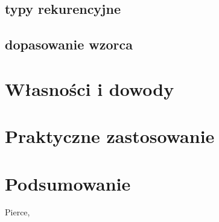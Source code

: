 \documentclass[11pt,leqno]{article}
\begin{document}
\subsection{typy rekurencyjne}
\subsection{dopasowanie wzorca}


\section{Własności i dowody}
\setcounter{equation}{0}



\section{Praktyczne zastosowanie}                       
\setcounter{equation}{0}


\section{Podsumowanie}                       
\setcounter{equation}{0}




\thispagestyle{empty}
\begin{thebibliography}{99}

 Pierce, \textit{} 


	  
\end{thebibliography}
\end{document}
